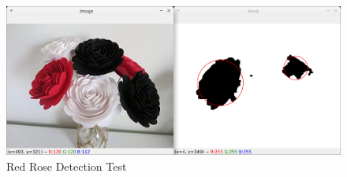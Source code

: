 \documentclass[11pt]{article}
\begin{document}
\begin{appendices}
    \begin{figure}[h!]
        \centering
        \includegraphics[width=160mm]{../test/blob/results/red_blob_4.png}
        \caption{Red Rose Detection Test}
        \label{fig:red_rose_detect_test}
    \end{figure}
    ~\\

\end{appendices}

\end{document}
